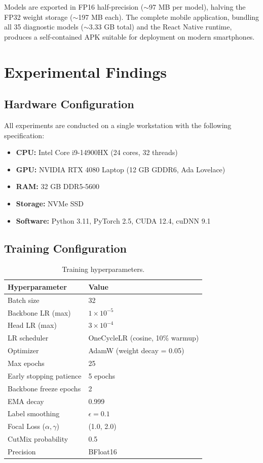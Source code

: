 \documentclass[12pt,a4paper]{report}
\begin{document}
Models are exported in FP16 half-precision ($\sim$97 MB per model), halving the FP32 weight storage ($\sim$197 MB each). The complete mobile application, bundling all 35 diagnostic models ($\sim$3.33 GB total) and the React Native runtime, produces a self-contained APK suitable for deployment on modern smartphones.


\chapter{Experimental Findings}

\section{Hardware Configuration}

All experiments are conducted on a single workstation with the following specification:

\begin{itemize}
    \item \textbf{CPU:} Intel Core i9-14900HX (24 cores, 32 threads)
    \item \textbf{GPU:} NVIDIA RTX 4080 Laptop (12 GB GDDR6, Ada Lovelace)
    \item \textbf{RAM:} 32 GB DDR5-5600
    \item \textbf{Storage:} NVMe SSD
    \item \textbf{Software:} Python 3.11, PyTorch 2.5, CUDA 12.4, cuDNN 9.1
\end{itemize}

\section{Training Configuration}

\begin{table}[H]
\centering
\caption{Training hyperparameters.}
\label{tab:hyperparams}
\begin{tabular}{@{}ll@{}}
\toprule
\textbf{Hyperparameter} & \textbf{Value} \\
\midrule
Batch size & 32 \\
Backbone LR (max) & $1 \times 10^{-5}$ \\
Head LR (max) & $3 \times 10^{-4}$ \\
LR scheduler & OneCycleLR (cosine, 10\% warmup) \\
Optimizer & AdamW (weight decay = 0.05) \\
Max epochs & 25 \\
Early stopping patience & 5 epochs \\
Backbone freeze epochs & 2 \\
EMA decay & 0.999 \\
Label smoothing & $\epsilon = 0.1$ \\
Focal Loss ($\alpha, \gamma$) & (1.0, 2.0) \\
CutMix probability & 0.5 \\
Precision & BFloat16 \\
\bottomrule
\end{tabular}
\end{table}
\end{document}
